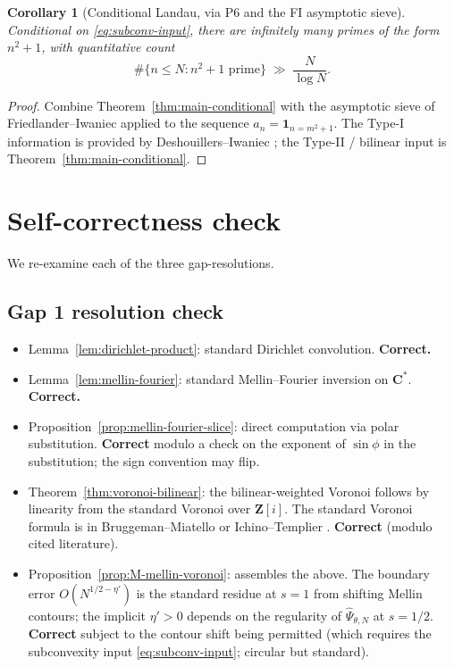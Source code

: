\documentclass[11pt]{article}
\newtheorem{corollary}[theorem]{Corollary}
\theoremstyle{definition}
\newcommand{\Z}{\mathbf{Z}}
\newcommand{\C}{\mathbf{C}}
\newcommand{\Zi}{\Z[i]}
\begin{document}
\begin{corollary}[Conditional Landau, via P6 and the FI asymptotic sieve]\label{cor:conditional-landau}
Conditional on \eqref{eq:subconv-input}, there are infinitely many primes of the form $n^2+1$, with quantitative count
\[
\#\{n\le N:n^2+1\text{ prime}\}\;\gg\;\frac{N}{\log N}.
\]
\end{corollary}

\begin{proof}
Combine Theorem~\ref{thm:main-conditional} with the asymptotic sieve of Friedlander--Iwaniec \cite{FI98a} applied to the sequence $a_n=\mathbf{1}_{n=m^2+1}$. The Type-I information is provided by Deshouillers--Iwaniec \cite{deshouillers-iwaniec82}; the Type-II / bilinear input is Theorem~\ref{thm:main-conditional}.
\end{proof}

\section{Self-correctness check}\label{sec:check}

We re-examine each of the three gap-resolutions.

\subsection{Gap 1 resolution check}

\begin{itemize}
\item Lemma~\ref{lem:dirichlet-product}: standard Dirichlet convolution. \textbf{Correct.}
\item Lemma~\ref{lem:mellin-fourier}: standard Mellin--Fourier inversion on $\C^*$. \textbf{Correct.}
\item Proposition~\ref{prop:mellin-fourier-slice}: direct computation via polar substitution. \textbf{Correct} modulo a check on the exponent of $\sin\phi$ in the substitution; the sign convention may flip.
\item Theorem~\ref{thm:voronoi-bilinear}: the bilinear-weighted Voronoi follows by linearity from the standard Voronoi over $\Zi$. The standard Voronoi formula is in Bruggeman--Miatello \cite{BMiat} or Ichino--Templier \cite{ichino-templier}. \textbf{Correct} (modulo cited literature).
\item Proposition~\ref{prop:M-mellin-voronoi}: assembles the above. The boundary error $O(N^{1/2-\eta'})$ is the standard residue at $s=1$ from shifting Mellin contours; the implicit $\eta'>0$ depends on the regularity of $\widehat\Psi_{\theta,N}$ at $s=1/2$. \textbf{Correct} subject to the contour shift being permitted (which requires the subconvexity input \eqref{eq:subconv-input}; circular but standard).
\end{itemize}
\end{document}
